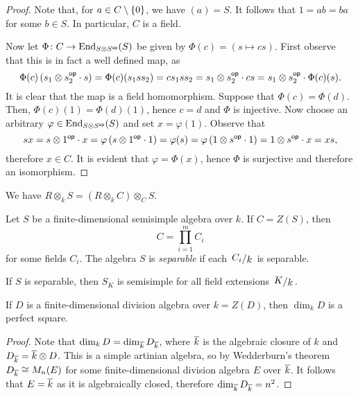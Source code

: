 \begin{proof}
Note that, for $a \in C \setminus \left\{0\right\}$, we have $(a) = S$. It
follows that $1 = ab = ba$ for some $b \in S$. In particular, $C$
is a field.

Now let $\Phi \colon C \to \operatorname{End}_{S \otimes S^{\mathsf{op}}}(S)$ be
given by $\Phi(c) = (s \mapsto cs)$. First observe that this is in
fact a well defined map, as
\[
\Phi(c) \left(s_1 \otimes s_2^{\mathsf{op}} \cdot s\right) =
\Phi(c)(s_1 s s_2) =
c s_1 s s_2 =
s_1 \otimes s_2^{\mathsf{op}} \cdot cs =
s_1 \otimes s_2^{\mathsf{op}} \cdot \Phi(c)(s).
\]
It is clear that the map is a field homomorphism. Suppose that
$\Phi(c) = \Phi(d)$. Then, $\Phi(c)(1) = \Phi(d)(1)$, hence $c = d$
and $\Phi$ is injective. Now choose an arbitrary
$\varphi \in \operatorname{End}_{S \otimes S^{\mathsf{op}}}(S)$ and set
$x = \varphi(1)$. Observe that
\[
sx =
s \otimes 1^{\mathsf{op}} \cdot x =
\varphi \left(s \otimes 1^{\mathsf{op}} \cdot 1\right) =
\varphi(s) =
\varphi \left(1 \otimes s^{\mathsf{op}} \cdot 1\right) =
1 \otimes s^{\mathsf{op}} \cdot x =
xs,
\]
therefore $x \in C$. It is evident that $\varphi = \Phi(x)$, hence
$\Phi$ is surjective and therefore an isomorphism.
\end{proof}

\begin{opomba}
We have $R \otimes_k S = (R \otimes_k C) \otimes_C S$.
\end{opomba}

\begin{definicija}
Let $S$ be a finite-dimensional semisimple algebra over $k$. If
$C = Z(S)$, then
\[
C = \prod_{i=1}^m C_i
\]
for some fields $C_i$. The algebra $S$ is
\emph{separable} if each $\kvoc{C_i}{k}$
is separable.
\end{definicija}

\begin{trditev}
If $S$ is separable, then $S_K$ is semisimple for all field
extensions $\kvoc{K}{k}$.
\end{trditev}


\begin{izrek}
If $D$ is a finite-dimensional division algebra over $k = Z(D)$,
then $\dim_k D$ is a perfect square.
\end{izrek}

\begin{proof}
Note that $\dim_k D = \dim_{\overline{k}} D_{\overline{k}}$, where
$\overline{k}$ is the algebraic closure of $k$ and
$D_{\overline{k}} = \overline{k} \otimes D$. This is a simple artinian
algebra, so by Wedderburn's theorem
$D_{\overline{k}} \cong M_n(E)$ for some finite-dimensional division
algebra $E$ over $\overline{k}$. It follows that $E = \overline{k}$ as
it is algebraically closed, therefore
$\dim_{\overline{k}} D_{\overline{k}} = n^2$.
\end{proof}

